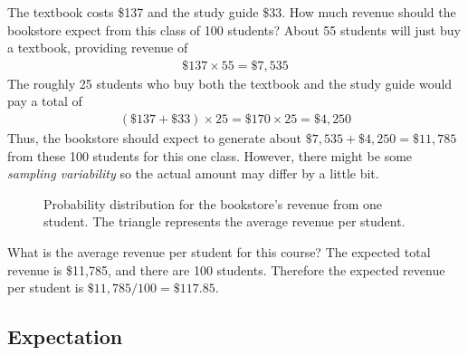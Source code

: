 \begin{examplewrap}
\begin{nexample}{The textbook costs \$137 and the study guide \$33. How much revenue should the bookstore expect from this class of 100 students?}\label{bookStoreRev}
About 55 students will just buy a textbook, providing revenue of
\begin{align*}
\$137 \times  55 = \$7,535
\end{align*}
The roughly 25 students who buy both the textbook and the study guide would pay a total of
\begin{align*}
(\$137 + \$33) \times  25 = \$170 \times  25 = \$4,250
\end{align*}
Thus, the bookstore should expect to generate about $\$7,535 + \$4,250 = \$11,785$ from these 100 students for this one class. However, there might be some \emph{sampling variability} so the actual amount may differ by a little bit.
\end{nexample}
\end{examplewrap}

\begin{figure}[h]
  \centering
  \caption{Probability distribution for the bookstore's
      revenue from one student.
      The triangle represents
      the average revenue per student.}
  \label{bookCostDist}
\end{figure}

\D{\newpage}

\begin{examplewrap}
\begin{nexample}{What is the average revenue per student for this course?}\label{revFromStudent}
The expected total revenue is \$11,785, and there are 100 students. Therefore the expected revenue per student is $\$11,785/100 =  \$117.85$.
\end{nexample}
\end{examplewrap}

\subsection{Expectation}

